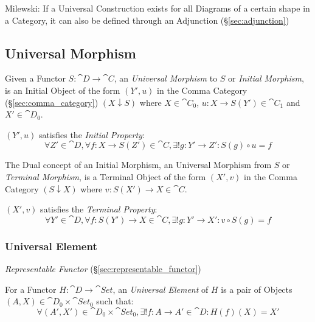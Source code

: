 Milewski: If a Universal Construction exists for all Diagrams of a
certain shape in a Category, it can also be defined through an
Adjunction (\S\ref{sec:adjunction})



\subsection{Universal Morphism}\label{sec:universal_morphism}

Given a Functor $S: \cat{D} \rightarrow \cat{C}$, an
\emph{Universal Morphism} to $S$ or \emph{Initial Morphism}, is an
Initial Object of the form $(Y',u)$ in the Comma Category
(\S\ref{sec:comma_category}) $(X \downarrow S)$ where $X \in
\cat{C}_0$, $u : X \rightarrow S(Y') \in \cat{C}_1$ and $X' \in
\cat{D}_0$.

$(Y', u)$ satisfies the \emph{Initial Property}:
\[
  \forall Z' \in \cat{D}, \forall f : X \rightarrow S(Z') \in
  \cat{C}, \exists! g : Y' \rightarrow Z' : S(g) \circ u = f
\]

The Dual concept of an Initial Morphism, an Universal Morphism from
$S$ or \emph{Terminal Morphism}, is a Terminal Object of the form
$(X',v)$ in the Comma Category $(S \downarrow X)$ where $v : S(X')
\rightarrow X \in \cat{C}$.

$(X',v)$ satisfies the \emph{Terminal Property}:
\[
  \forall Y' \in \cat{D}, \forall f : S(Y') \rightarrow X \in
  \cat{C}, \exists! g : Y' \rightarrow X' : v \circ S(g) = f
\]




\subsubsection{Universal Element}\label{sec:universal_element}

\emph{Representable Functor} (\S\ref{sec:representable_functor})

For a Functor $H : \cat{D} \rightarrow \cat{Set}$, an
\emph{Universal Element} of $H$ is a pair of Objects $(A,X) \in
\cat{D}_0 \times \cat{Set}_0$ such that:
\[
  \forall (A',X') \in \cat{D}_0 \times \cat{Set}_0,
  \exists! f : A \rightarrow A' \in \cat{D} : H(f)(X) = X'
\]



